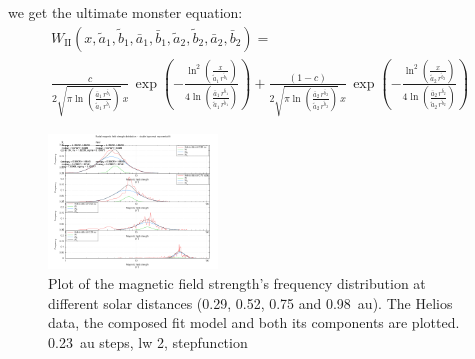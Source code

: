 
we get the ultimate monster equation:\\
\begin{align}
	W_\text{II}(x,\tilde{a}_1, \tilde{b}_1, \bar{a}_1, \bar{b}_1, \tilde{a}_2, \tilde{b}_2, \bar{a}_2, \bar{b}_2) =\\
	\frac{c}{2 \sqrt{\pi \ln\left(\frac{\bar{a}_1 \, r^{\bar{b}_1}}{\tilde{a}_1 \, r^{\tilde{b}_1}}\right)} \, x} \, \exp\left(- \frac{\ln^2\left(\frac{x}{\tilde{a}_1 \, r^{\tilde{b}_1}}\right)}{4 \ln\left(\frac{\bar{a}_1 \, r^{\bar{b}_1}}{\tilde{a}_1 \, r^{\tilde{b}_1}}\right)}\right) + \frac{(1 - c)}{2 \sqrt{\pi \ln\left(\frac{\bar{a}_2 \, r^{\bar{b}_2}}{\tilde{a}_2 \, r^{\tilde{b}_2}}\right)} \, x} \, \exp\left(- \frac{\ln^2\left(\frac{x}{\tilde{a}_2 \, r^{\tilde{b}_2}}\right)}{4 \ln\left(\frac{\bar{a}_2 \, r^{\bar{b}_2}}{\tilde{a}_2 \, r^{\tilde{b}_2}}\right)}\right)
\end{align}

\begin{figure}[htb]
	\centering
	\includegraphics[width=0.4\textwidth]{images/gnuplots/double_fit_B_freq_r_plot_thesis.png}
	\caption{Plot of the magnetic field strength's frequency distribution at different solar distances (0.29, 0.52, 0.75 and 0.98~au). The Helios data, the composed fit model and both its components are plotted. 0.23~au steps, lw 2, stepfunction}
	\label{fig:double_fit_B_freq_r_plot_thesis}
\end{figure}

